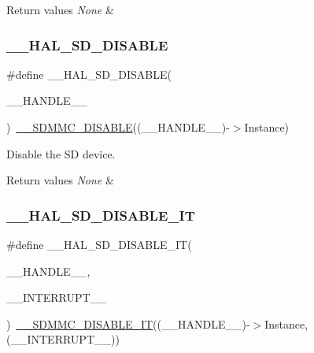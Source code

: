 \begin{DoxyRetVals}{Return values}
{\em None} & \\
\hline
\end{DoxyRetVals}
\mbox{\label{group___s_d___exported__macros_ga3d6615771e538261189c0a6dd1ef5d47}} 
\subsubsection{\texorpdfstring{\_\_HAL\_SD\_DISABLE}{\_\_HAL\_SD\_DISABLE}}
{\footnotesize\ttfamily \#define \+\_\+\+\_\+\+H\+A\+L\+\_\+\+S\+D\+\_\+\+D\+I\+S\+A\+B\+LE(\begin{DoxyParamCaption}\item[{}]{\+\_\+\+\_\+\+H\+A\+N\+D\+L\+E\+\_\+\+\_\+ }\end{DoxyParamCaption})~\mbox{\hyperlink{group___s_d_m_m_c___l_l___interrupt___clock_gaf3ddbea0ba674cf1bc84fc1a4558840b}{\+\_\+\+\_\+\+S\+D\+M\+M\+C\+\_\+\+D\+I\+S\+A\+B\+LE}}((\+\_\+\+\_\+\+H\+A\+N\+D\+L\+E\+\_\+\+\_\+)-\/$>$Instance)}



Disable the SD device. 


\begin{DoxyRetVals}{Return values}
{\em None} & \\
\hline
\end{DoxyRetVals}
\mbox{\label{group___s_d___exported__macros_gade37d2edfef64e867315f90adf574cba}} 
\subsubsection{\texorpdfstring{\_\_HAL\_SD\_DISABLE\_IT}{\_\_HAL\_SD\_DISABLE\_IT}}
{\footnotesize\ttfamily \#define \+\_\+\+\_\+\+H\+A\+L\+\_\+\+S\+D\+\_\+\+D\+I\+S\+A\+B\+L\+E\+\_\+\+IT(\begin{DoxyParamCaption}\item[{}]{\+\_\+\+\_\+\+H\+A\+N\+D\+L\+E\+\_\+\+\_\+,  }\item[{}]{\+\_\+\+\_\+\+I\+N\+T\+E\+R\+R\+U\+P\+T\+\_\+\+\_\+ }\end{DoxyParamCaption})~\mbox{\hyperlink{group___s_d_m_m_c___l_l___interrupt___clock_gadc1f20eee0d4a76c9f416893569ad5d0}{\+\_\+\+\_\+\+S\+D\+M\+M\+C\+\_\+\+D\+I\+S\+A\+B\+L\+E\+\_\+\+IT}}((\+\_\+\+\_\+\+H\+A\+N\+D\+L\+E\+\_\+\+\_\+)-\/$>$Instance, (\+\_\+\+\_\+\+I\+N\+T\+E\+R\+R\+U\+P\+T\+\_\+\+\_\+))}



